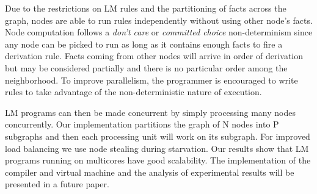Due to the restrictions on LM rules and the partitioning of facts across the graph, nodes are able to
run rules independently without using other node's facts. Node computation follows a \emph{don't care} or \emph{committed choice} non-determinism
since any node can be picked to run as long as it contains enough facts to fire a derivation rule.
Facts coming from other nodes will arrive in order of derivation but may be considered
partially and there is no particular order among the neighborhood. To improve parallelism, the programmer is encouraged to write rules to take
advantage of the non-deterministic nature of execution.

LM programs can then be made concurrent by simply processing many nodes concurrently.
Our implementation partitions the graph of N nodes into P subgraphs and then each processing unit will work on its subgraph.
For improved load balancing we use node stealing during starvation.
Our results show that LM programs running on multicores have good scalability.
The implementation of the compiler and virtual machine and
the analysis of experimental results will be presented in a future paper.

\vspace{-4mm}